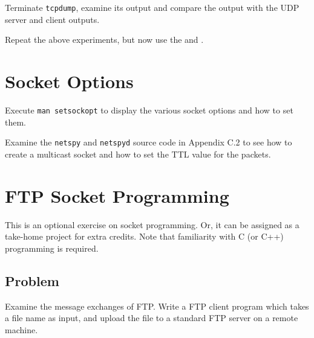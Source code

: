 \documentclass{../UTNetLab}
\begin{document}
    Terminate \lstinline{tcpdump}, examine its output and compare the output with the UDP server and client outputs.

    Repeat the above experiments, but now use the  and .

\section{Socket Options}
    Execute \lstinline{man setsockopt} to display the various socket options and how to set them.

    Examine the \lstinline{netspy} and \lstinline{netspyd} source code in Appendix C.2 to see how to create a multicast socket and how to set the TTL value for the packets.
    

\section{FTP Socket Programming}
    This is an optional exercise on socket programming. Or, it can be assigned as a take-home project for extra credits. Note that familiarity with C (or C++) programming is required.

    \subsection*{Problem}
    Examine the message exchanges of FTP. Write a FTP client program which takes a file name as input, and upload the file to a standard FTP server on a remote machine.
\end{document}
